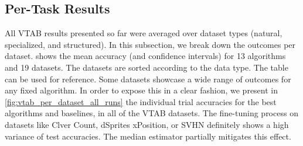 \documentclass{article}
\begin{document}
\subsection{Per-Task Results}
\label{subsec:vtab_per_task_results}
All VTAB results presented so far were averaged over dataset types (natural, specialized, and structured).
In this subsection, we break down the outcomes per dataset.
 shows the mean accuracy (and confidence intervals) for 13 algorithms and 19 datasets.
The datasets are sorted according to the data type.
The table can be used for reference.
Some datasets showcase a wide range of outcomes for any fixed algorithm.
In order to expose this in a clear fashion, we present in \cref{fig:vtab_per_dataset_all_runs} the individual trial accuracies for the best algorithms and baselines, in all of the VTAB datasets.
The fine-tuning process on datasets like Clver Count, dSprites xPosition, or SVHN definitely shows a high variance of test accuracies.
The median estimator partially mitigates this effect.
\end{document}
